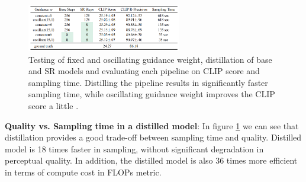 \begin{figure}
    \centering
    \includegraphics[width=0.6\textwidth]{images/imagen_video/experiments_table.png}
    \caption{Testing of fixed and oscillating guidance weight, distillation of base and SR models and evaluating each pipeline on CLIP score and sampling time. Distilling the pipeline results in significantly faster sampling time, while oscillating guidance weight improves the CLIP score a little \cite{imagen_video}.}
    \label{fig:imagen_video_experiments_table}
\end{figure}

\textbf{Quality vs. Sampling time in a distilled model}: In figure \ref{fig:imagen_video_experiments_table} we can see that distillation provides a good trade-off between sampling time and quality. Distilled model is 18 times faster in sampling, without significant degradation in perceptual quality. In addition, the distilled model is also 36 times more efficient in terms of compute cost in FLOPs metric. 

